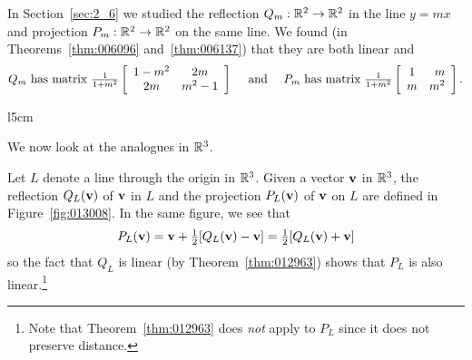 In Section~\ref{sec:2_6} we studied the reflection $Q_{m} : \mathbb{R}^2 \to \mathbb{R}^2$ in the line $y = mx$ and projection $P_{m} : \mathbb{R}^2 \to \mathbb{R}^2$ on the same line. We found (in Theorems~\ref{thm:006096} and~\ref{thm:006137}) that they are both linear and
\begin{equation*}
Q_{m} \mbox{ has matrix } \tfrac{1}{1 + m^2}\left[
\begin{array}{cc}
1 - m^2 & 2m \\
2m & m^2 -1
\end{array}
\right]
\quad \mbox{ and } \quad P_{m} \mbox{ has matrix }\tfrac{1}{1 + m^2}\left[
\begin{array}{cr}
1  & m \\
m & m^2
\end{array}
\right].
\end{equation*}

\begin{wrapfigure}[9]{l}{5cm} 
  \vspace*{-1em}
	\centering
	
	\caption{\label{fig:013008}}
\end{wrapfigure}

We now look at the analogues in $\mathbb{R}^3$.

Let $L$ denote a line through the origin in $\mathbb{R}^3$. Given a vector $\textbf{v}$ in $\mathbb{R}^3$, the reflection $Q_{L}(\textbf{v})$ of $\textbf{v}$ in $L$ and the projection $P_{L}(\textbf{v})$ of $\textbf{v}$ on $L$ are defined in Figure~\ref{fig:013008}. In the same figure, we see that
\begin{equation}\label{eq:refProjEq}
P_{L}(\textbf{v}) = \textbf{v} + \tfrac{1}{2}[Q_{L}(\textbf{v}) - \textbf{v}] = \tfrac{1}{2}[Q_{L}(\textbf{v}) + \textbf{v}]
\end{equation}
so the fact that $Q_{L}$ is linear (by Theorem~\ref{thm:012963}) shows that $P_{L}$ is also linear.\footnote{Note that Theorem~\ref{thm:012963} does \textit{not} apply to $P_{L}$ since it does not preserve distance.}


